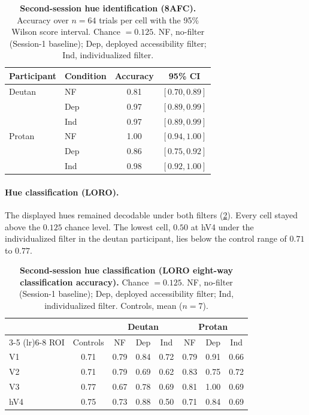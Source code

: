 \begin{table}[tb]
  \centering
  \caption{\textbf{Second-session hue identification (8AFC).} Accuracy over $n = 64$ trials per cell with the 95\% Wilson score interval. Chance $= 0.125$. NF, no-filter (Session-1 baseline); Dep, deployed accessibility filter; Ind, individualized filter.}
  \label{tab:exp2_8afc}
  \begin{tabular}{llcc}
    \toprule
    Participant & Condition & Accuracy & 95\% CI \\
    \midrule
    Deutan & NF  & 0.81 & $[0.70, 0.89]$ \\
                    & Dep & 0.97 & $[0.89, 0.99]$ \\
                    & Ind & 0.97 & $[0.89, 0.99]$ \\
    \midrule
    Protan & NF  & 1.00 & $[0.94, 1.00]$ \\
                    & Dep & 0.86 & $[0.75, 0.92]$ \\
                    & Ind & 0.98 & $[0.92, 1.00]$ \\
    \bottomrule
  \end{tabular}
\end{table}

\paragraph{Hue classification (LORO).}
The displayed hues remained decodable under both filters (\cref{tab:exp2_loro}). Every cell stayed above the $0.125$ chance level. The lowest cell, $0.50$ at hV4 under the individualized filter in the deutan participant, lies below the control range of $0.71$ to $0.77$.

\begin{table}[tb]
  \centering
  \caption{\textbf{Second-session hue classification (LORO eight-way classification accuracy).} Chance $= 0.125$. NF, no-filter (Session-1 baseline); Dep, deployed accessibility filter; Ind, individualized filter. Controls, mean ($n = 7$).}
  \label{tab:exp2_loro}
  \begin{tabular}{lccccccc}
    \toprule
     & & \multicolumn{3}{c}{Deutan} & \multicolumn{3}{c}{Protan} \\
    \cmidrule(lr){3-5} \cmidrule(lr){6-8}
    ROI & Controls & NF & Dep & Ind & NF & Dep & Ind \\
    \midrule
    V1  & 0.71 & 0.79 & 0.84 & 0.72 & 0.79 & 0.91 & 0.66 \\
    V2  & 0.71 & 0.79 & 0.69 & 0.62 & 0.83 & 0.75 & 0.72 \\
    V3  & 0.77 & 0.67 & 0.78 & 0.69 & 0.81 & 1.00 & 0.69 \\
    hV4 & 0.75 & 0.73 & 0.88 & 0.50 & 0.71 & 0.84 & 0.69 \\
    \bottomrule
  \end{tabular}
\end{table}

